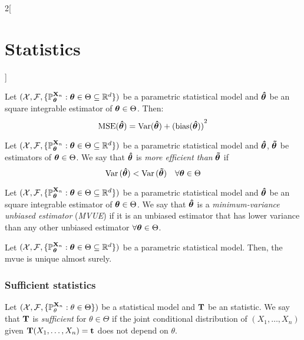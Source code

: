\documentclass[../../../main.tex]{subfiles}
\begin{document}
\begin{multicols}{2}[\section{Statistics}]
\begin{proposition}
    Let $(\mathcal{X},\mathcal{F},\{\mathbb{P}_{\boldsymbol{\mathrm{\theta}}}^{\boldsymbol{\mathrm{X}}_n}:\boldsymbol{\mathrm{\theta}}\in\Theta\subseteq \mathbb{R}^d\})$ be a parametric statistical model and $\boldsymbol{\mathrm{\hat\theta}}$ be an square integrable estimator of $\boldsymbol{\mathrm{\theta}}\in\Theta$. Then: $$\operatorname{MSE}(\boldsymbol{\mathrm{\hat\theta}})=\operatorname{Var}(\boldsymbol{\mathrm{\hat\theta}})+{(\operatorname{bias}(\boldsymbol{\mathrm{\hat\theta}}))}^2$$
  \end{proposition}
  \begin{definition}
    Let $(\mathcal{X},\mathcal{F},\{\mathbb{P}_{\boldsymbol{\mathrm{\theta}}}^{\boldsymbol{\mathrm{X}}_n}:\boldsymbol{\mathrm{\theta}}\in\Theta\subseteq \mathbb{R}^d\})$ be a parametric statistical model and $\boldsymbol{\mathrm{\hat\theta}}$, $\boldsymbol{\mathrm{\tilde\theta}}$ be estimators of $\boldsymbol{\mathrm{\theta}}\in\Theta$. We say that $\boldsymbol{\mathrm{\hat\theta}}$ is \emph{more efficient than} $\boldsymbol{\mathrm{\tilde\theta}}$ if $$\operatorname{Var}{(\boldsymbol{\mathrm{\hat\theta}})}<\operatorname{Var}{(\boldsymbol{\mathrm{\tilde\theta}})}\quad\forall\boldsymbol{\mathrm{\theta}}\in\Theta$$
  \end{definition}
  \begin{definition}
    Let $(\mathcal{X},\mathcal{F},\{\mathbb{P}_{\boldsymbol{\mathrm{\theta}}}^{\boldsymbol{\mathrm{X}}_n}:\boldsymbol{\mathrm{\theta}}\in\Theta\subseteq \mathbb{R}^d\})$ be a parametric statistical model and $\boldsymbol{\mathrm{\hat\theta}}$ be an square integrable estimator of $\boldsymbol{\mathrm{\theta}}\in\Theta$. We say that $\boldsymbol{\mathrm{\hat\theta}}$ is a \emph{minimum-variance unbiased estimator} (\emph{MVUE}) if it is an unbiased estimator that has lower variance than any other unbiased estimator $\forall \boldsymbol{\mathrm{\theta}}\in\Theta$.
  \end{definition}
  \begin{proposition}
    Let $(\mathcal{X},\mathcal{F},\{\mathbb{P}_{\boldsymbol{\mathrm{\theta}}}^{\boldsymbol{\mathrm{X}}_n}:\boldsymbol{\mathrm{\theta}}\in\Theta\subseteq \mathbb{R}^d\})$ be a parametric statistical model. Then, the mvue is unique almost surely.
  \end{proposition}
  \subsubsection{Sufficient statistics}
  \begin{definition}
    Let $(\mathcal{X},\mathcal{F},\{\mathbb{P}_\theta^{\boldsymbol{\mathrm{X}}_n}:\theta\in\Theta\})$ be a statistical model and $\boldsymbol{\mathrm{T}}$ be an statistic. We say that $\boldsymbol{\mathrm{T}}$ is \emph{sufficient} for $\theta\in\Theta$ if the joint conditional distribution of $(X_1,\ldots,X_n)$ given $\boldsymbol{\mathrm{T}}(X_1,\ldots,X_n)=\boldsymbol{\mathrm{t}}$ does not depend on $\theta$.
  \end{definition}

\end{multicols}
\end{document}
